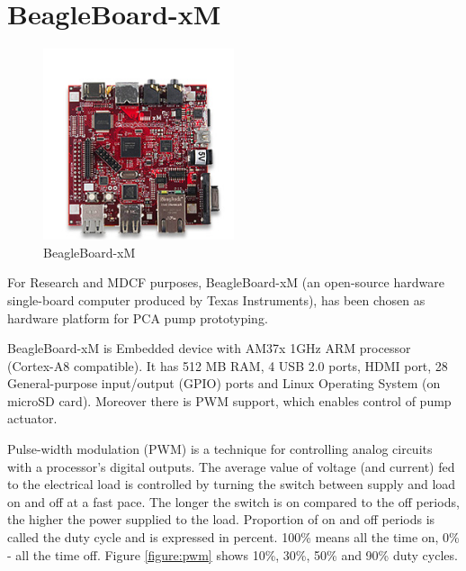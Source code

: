 \section{BeagleBoard-xM}
\label{pcapump:beagleboard}

\begin{figure}
  \begin{center}
    \includegraphics[width=0.5\textwidth]{figures/beagleboard_xm.png}
  \end{center}
  \caption{BeagleBoard-xM}
  \label{figure:beagleboard_xm}
\end{figure}

For Research and MDCF purposes, BeagleBoard-xM (an open-source hardware single-board computer produced by Texas Instruments), has been chosen as hardware platform for PCA pump prototyping.

BeagleBoard-xM is Embedded device with AM37x 1GHz ARM processor (Cortex-A8 compatible). It has 512 MB RAM, 4 USB 2.0 ports, HDMI port, 28 General-purpose input/output (GPIO) ports and Linux Operating System (on microSD card). Moreover there is PWM support, which enables control of pump actuator.

Pulse-width modulation (PWM) is a technique for controlling analog circuits with a processor's digital outputs. The average value of voltage (and current) fed to the electrical load is controlled by turning the switch between supply and load on and off at a fast pace. The longer the switch is on compared to the off periods, the higher the power supplied to the load. Proportion of on and off periods is called the duty cycle and is expressed in percent. 100\% means all the time on, 0\% - all the time off. Figure \ref{figure:pwm} shows 10\%, 30\%, 50\% and 90\% duty cycles.

